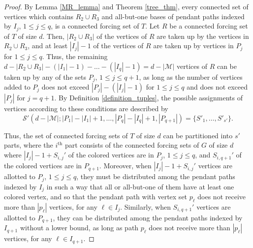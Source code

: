 \documentclass[11pt]{article}
\theoremstyle{definition}
\newcommand{\1}{\vspace{0.1cm}}
\newcommand{\2}{\vspace{0.2cm}}
\newcommand{\3}{\vspace{0.3cm}}
\begin{document}
\begin{proof}
By Lemma \ref{MR_lemma} and Theorem \ref{tree_thm}, every connected set of vertices which contains $R_2\cup R_3$ and all-but-one bases of pendant paths indexed by $I_j$, $1\leq j\leq q$, is a connected forcing set of $T$. Let $R$ be a connected forcing set of $T$ of size $d$. Then, $|R_2\cup R_3|$ of the vertices of $R$ are taken up by the vertices in $R_2\cup R_3$, and at least $|I_j|-1$ of the vertices of $R$ are taken up by vertices in $P_j$ for $1\leq j\leq q$. Thus, the remaining $d-|R_2\cup R_3|-(|I_1|-1)-\ldots-(|I_q|-1)=d-|\mathcal{M}|$ vertices of $R$ can be taken up by any of the sets $P_j$, $1\leq j\leq q+1$, as long as the number of vertices added to $P_j$ does not exceed $|P_j|-(|I_j|-1)$ for $1\leq j\leq q$ and does not exceed $|P_j|$ for $j=q+1$. By Definition \ref{definition_tuples}, the possible assignments of vertices according to these conditions are described by 
\begin{equation*}
\mathcal{S}'(d-|\mathcal{M}|;|P_1|-|I_1|+1,\ldots,|P_q|-|I_q|+1,|P_{q+1}|)=\{S'_1,\ldots,S'_{s'}\}.
\end{equation*}


Thus, the set of connected forcing sets of $T$ of size $d$ can be partitioned into $s'$ parts, where the $i^\text{th}$ part consists of the connected forcing sets of $G$ of size $d$ where $|I_j|-1+S_{i,j}'$ of the colored vertices are in $P_j$, $1\leq j\leq q$, and $S_{i,q+1}'$ of the colored vertices are in $P_{q+1}$. Moreover, when $|I_j|-1+S_{i,j}'$ vertices are allotted to $P_j$, $1\leq j\leq q$, they must be distributed among the pendant paths indexed by $I_j$ in such a way that all or all-but-one of them have at least one colored vertex, and so that the pendant path with vertex set $p_\ell$ does not receive more than $|p_\ell|$ vertices, for any $\ell\in I_j$. Similarly, when $S_{i,q+1}'$ vertices are allotted to $P_{q+1}$, they can be distributed among the pendant paths indexed by $I_{q+1}$ without a lower bound, as long as path $p_\ell$ does not receive more than $|p_\ell|$ vertices, for any $\ell\in I_{q+1}$.


\end{proof}
\end{document}
